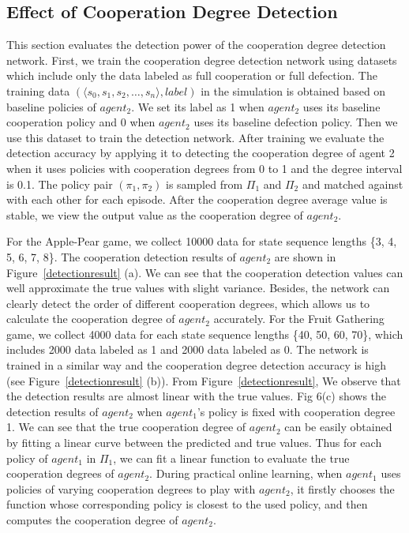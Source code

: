 \documentclass{article}
\begin{document}
\subsection{Effect of Cooperation Degree Detection}
This section evaluates the detection power of the cooperation degree detection network. First, we train the cooperation degree detection network using datasets which include only the data labeled as full cooperation or full defection. The training data $(\langle s_0, s_1, s_2, \ldots, s_n \rangle,label)$ in the simulation is obtained based on baseline policies of $agent_2$. We set its label as 1 when $agent_2$ uses its baseline cooperation policy and 0 when $agent_2$ uses its baseline defection policy. Then we use this dataset to train the detection network. After training we evaluate the detection accuracy by applying it to detecting the cooperation degree of agent 2 when it uses policies with cooperation degrees from 0 to 1 and the degree interval is 0.1. The policy pair $(\pi_1, \pi_2)$ is sampled from $\Pi_1$ and $\Pi_2$ and matched against with each other for each episode. After the cooperation degree average value is stable, we view the output value as the cooperation degree of $agent_2$.

For the Apple-Pear game, we collect 10000 data for state sequence lengths \{3, 4, 5, 6, 7, 8\}. The cooperation detection results of $agent_2$ are shown in Figure~\ref{detectionresult} (a). We can see that the cooperation detection values can well approximate the true values with slight variance. Besides, the network can clearly detect the order of different cooperation degrees, which allows us to calculate the cooperation degree of $agent_2$ accurately. For the Fruit Gathering game, we collect 4000 data for each state sequence lengths \{40, 50, 60, 70\}, which includes 2000 data labeled as 1 and 2000 data labeled as 0. The network is trained in a similar way and the cooperation degree detection accuracy is high (see Figure~\ref{detectionresult} (b)). From Figure~\ref{detectionresult}, We observe that the detection results are almost linear with the true values. Fig 6(c) shows the detection results of $agent_2$ when $agent_1$'s policy is fixed with cooperation degree 1. We can see that the true cooperation degree of $agent_2$ can be easily obtained by fitting a linear curve between the predicted and true values. Thus for each policy of $agent_1$ in $\Pi_1$, we can fit a linear function to evaluate the true cooperation degrees of $agent_2$. During practical online learning, when $agent_1$ uses policies of varying cooperation degrees to play with $agent_2$, it firstly chooses the function whose corresponding policy is closest to the used policy, and then computes the cooperation degree of $agent_2$.
\end{document}

